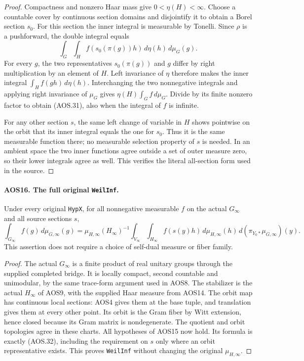 \documentclass[11pt,a4paper]{article}
\numberwithin{equation}{section}
\theoremstyle{remark}\newtheorem{remark}[theorem]{Remark}
\begin{document}
\begin{proof}
Compactness and nonzero Haar mass give $0<\eta(H)<\infty$.
Choose a countable cover by continuous section domains and
disjointify it to obtain a Borel section $s_0$.
For this section the inner integral is measurable by Tonelli.
Since $\rho$ is a pushforward, the double integral equals
\[
      \int_G\int_H f(s_0(\pi(g))h)\,d\eta(h)\,d\mu_G(g).
\]
For every $g$, the two representatives $s_0(\pi(g))$ and $g$
differ by right multiplication by an element of $H$.
Left invariance of $\eta$ therefore makes the inner integral
$\int_H f(gh)\,d\eta(h)$.  Interchanging the two nonnegative
integrals and applying right invariance of $\mu_G$ gives
$\eta(H)\int_G f\,d\mu_G$.  Divide by its finite nonzero
factor to obtain (AOS.31), also when the integral of $f$ is infinite.

For any other section $s$, the same left change of variable in $H$
shows pointwise on the orbit that its inner integral equals the
one for $s_0$.  Thus it is the same measurable function there;
no measurable selection property of $s$ is needed.  In an ambient
space the two inner functions agree outside a set of outer measure
zero, so their lower integrals agree as well.  This verifies the
literal all-section form used in the source.
\end{proof}

\paragraph{AOS16. The full original \texttt{Weil\allowbreak Inf}.}
\label{claim:AOS16}
Under every original \texttt{Hyp\allowbreak X}, for all nonnegative measurable
$f$ on the actual $G_\infty$ and all source sections $s$,
\[
 \int_{G_\infty}f(g)\,d\mu_{G,\infty}(g)
   =\mu_{H,\infty}(H_\infty)^{-1}
        \int_{V_\infty}\int_{H_\infty}
                 f(s(y)h)\,d\mu_{H,\infty}(h)
                     \,d(\pi_{Y_0*}\mu_{G,\infty})(y).
 \tag{AOS.32}
\]
This assertion does not require a choice of self-dual measure or
fiber family.

\begin{proof}
The actual $G_\infty$ is a finite product of real unitary groups
through the supplied completed bridge.  It is locally compact,
second countable and unimodular, by the same trace-form argument
used in AOS8.  The stabilizer is the actual $H_\infty$ of AOS9,
with the supplied Haar measure from AOS14.  The orbit map has
continuous local sections: AOS4 gives them at the base tuple,
and translation gives them at every other point.  Its orbit is
the Gram fiber by Witt extension, hence closed because its Gram
matrix is nondegenerate.  The quotient and orbit topologies agree
in these charts.  All hypotheses of AOS15 now hold.  Its formula
is exactly (AOS.32), including the requirement on $s$ only where
an orbit representative exists.  This proves \texttt{Weil\allowbreak Inf}
without changing the original $\mu_{H,\infty}$.
\end{proof}
\end{document}
